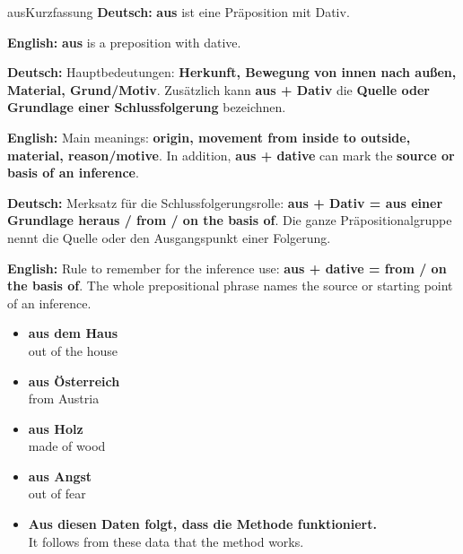 \documentclass[a4paper,11pt]{article}
\newcommand{\GermanText}[1]{\textbf{Deutsch: }#1\par}
\newcommand{\EnglishText}[1]{{\small\color{SoftGray}\textbf{English: }#1\par}}
\newcommand{\ExampleItem}[2]{\item \textbf{#1}\\{\small\color{SoftGray}#2}}
\begin{document}
\begin{grammarentry}{aus}{Kurzfassung}
\GermanText{\textbf{aus} ist eine Präposition mit Dativ.}
\EnglishText{\textbf{aus} is a preposition with dative.}

\GermanText{Hauptbedeutungen: \textbf{Herkunft, Bewegung von innen nach außen, Material, Grund/Motiv}. Zusätzlich kann \textbf{aus + Dativ} die \textbf{Quelle oder Grundlage einer Schlussfolgerung} bezeichnen.}
\EnglishText{Main meanings: \textbf{origin, movement from inside to outside, material, reason/motive}. In addition, \textbf{aus + dative} can mark the \textbf{source or basis of an inference}.}

\GermanText{Merksatz für die Schlussfolgerungsrolle: \textbf{aus + Dativ = aus einer Grundlage heraus / from / on the basis of}. Die ganze Präpositionalgruppe nennt die Quelle oder den Ausgangspunkt einer Folgerung.}
\EnglishText{Rule to remember for the inference use: \textbf{aus + dative = from / on the basis of}. The whole prepositional phrase names the source or starting point of an inference.}
\end{grammarentry}

\begin{exbox}
\begin{itemize}
\ExampleItem{aus dem Haus}{out of the house}
\ExampleItem{aus Österreich}{from Austria}
\ExampleItem{aus Holz}{made of wood}
\ExampleItem{aus Angst}{out of fear}
\ExampleItem{Aus diesen Daten folgt, dass die Methode funktioniert.}{It follows from these data that the method works.}
\end{itemize}
\end{exbox}
\end{document}
